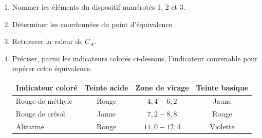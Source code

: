 \begin{enumerate}
          \begin{enumerate}
              \item Nommer les éléments du dispositif numérotés 1, 2 et 3.
              \item Déterminer les coordonnées du point d'équivalence.
              \item Retrouver la valeur de $C_{A}$.
              \item Préciser, parmi les indicateurs colorés ci-dessous,
                    l'indicateur convenable pour repérer cette équivalence.
          
                    \begin{minipage}{\linewidth}
                        \begin{table}[H]
                            \centering
                            \begin{tabularx}{\textwidth}{|p{4cm}|C|C|C|}
                                \hline
                                \textbf{Indicateur coloré} &
                                \textbf{Teinte acide} &
                                \textbf{Zone de virage} &
                                \textbf{Teinte basique} \\
                                \hline
                                Rouge de méthyle & Rouge & $4,4-6,2$ & Jaune \\
                                \hline
                                Rouge de crésol & Jaune & $7,2-8,8$ & Rouge \\
                                \hline
                                Alizarine & Rouge & $11,0-12,4$ & Violette \\
                                \hline
                            \end{tabularx}
                        \end{table}
                    \end{minipage}
          \end{enumerate}
\end{enumerate}

